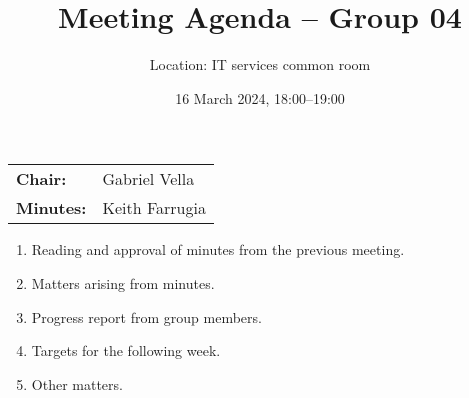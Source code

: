 \documentclass{cce2014-meetings}
\title{Meeting Agenda -- Group 04}
\author{Location: IT services common room}
\date{16 March 2024, 18:00--19:00}
\begin{document}
\maketitle
\begin{center}
        \begin{tabular}{ll}
                \textbf{Chair:}   & Gabriel Vella \\
                \textbf{Minutes:} & Keith Farrugia
        \end{tabular}
\end{center}

\begin{enumerate}

        \item Reading and approval of minutes from the previous meeting.

        \item Matters arising from minutes.

        \item Progress report from group members.

        \item Targets for the following week.

        \item Other matters.

\end{enumerate}
\end{document}
